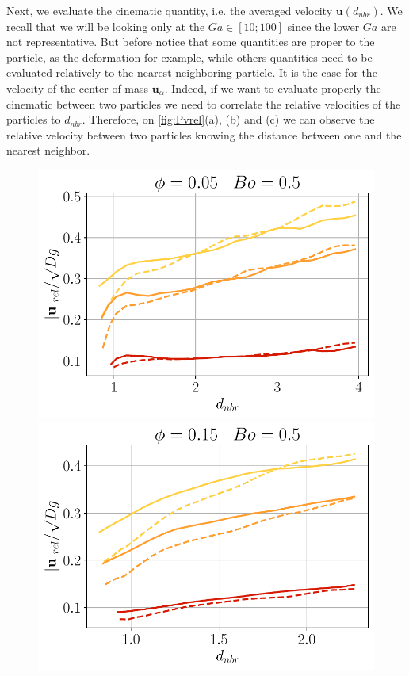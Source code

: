 Next, we evaluate the cinematic quantity, i.e. the averaged velocity $\bm{u}(d_{nbr})$. 
We recall that we will be looking only at the $Ga \in [10;100]$ since the lower $Ga$ are not representative. 
But before notice that some quantities are proper to the particle, as the deformation for example, while others quantities need to be evaluated relatively to the nearest neighboring particle. 
It is the case for the velocity of the center of mass $\bm{u}_\alpha$.
Indeed, if we want to evaluate properly the cinematic between two particles we need to correlate the relative velocities of the particles to $d_{nbr}$. 
Therefore, on \ref{fig:Pvrel}(a), (b) and (c) we can observe the relative velocity between two particles knowing the distance between one and the nearest neighbor. 
    \begin{figure}[h!]
        \centering
        \includegraphics[height=0.16\textheight]{image/N_10/Pcond/probav_relBo0_5PHI0_05.pdf}
        \includegraphics[height=0.16\textheight]{image/N_10/Pcond/probav_relBo0_5PHI0_15.pdf}

\end{figure}
